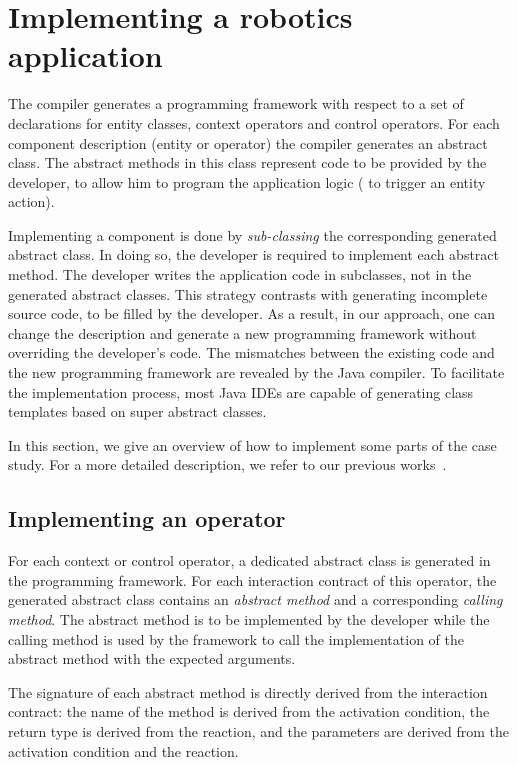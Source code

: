 
\section{Implementing a robotics application}
\label{sec:implementing}

The \diaspec{} compiler generates a programming framework with respect
to a set of declarations for entity classes, context operators and
control operators. For each component description (entity or operator)
the compiler generates an abstract class. The abstract methods in this
class represent code to be provided by the developer, to allow him to
program the application logic (\eg{} to trigger an entity action). 

Implementing a \diaspec{} component is done by \textit{sub-classing}
the corresponding generated abstract class. In doing so, the developer
is required to implement each abstract method. The developer writes
the application code in subclasses, not in the generated abstract
classes. This strategy contrasts with generating incomplete source
code, to be filled by the developer. As a result, in our approach, one
can change the \diaspec{} description and generate a new programming
framework without overriding the developer's code. The mismatches
between the existing code and the new programming framework are
revealed by the Java compiler. To facilitate the implementation
process, most Java IDEs are capable of generating class templates
based on super abstract classes.

In this section, we give an overview of how to implement some parts of
the case study. For a more detailed description, we refer to our
previous works~\cite{Cass09b,Cass11a,Cass11b}.

\subsection{Implementing an operator}

For each context or control operator, a dedicated abstract class is
generated in the programming framework. For each interaction contract
of this operator, the generated abstract class contains an
\emph{abstract method} and a corresponding \emph{calling method}. The
abstract method is to be implemented by the developer while the
calling method is used by the framework to call the implementation of
the abstract method with the expected arguments.

The signature of each abstract method is directly derived from the
interaction contract: the name of the method is derived from the
activation condition, the return type is derived from the reaction,
and the parameters are derived from the activation condition and the
reaction.

